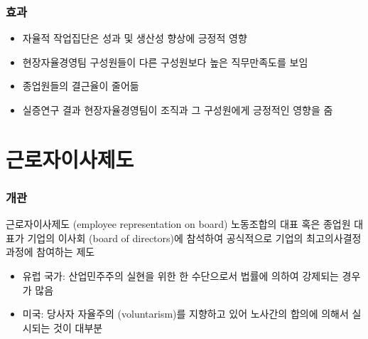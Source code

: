 \documentclass[aspectratio=169,xcolor=dvipsnames,handout]{beamer}
\begin{document}
\begin{frame}
    \frametitle{효과}
    \begin{itemize}[<+->]
        \item 자율적 작업집단은 성과 및 생산성 향상에 긍정적 영향
        \item 현장자율경영팀 구성원들이 다른 구성원보다 높은 직무만족도를 보임
        \item 종업원들의 결근율이 줄어듦
        \item 실증연구 결과 현장자율경영팀이 조직과 그 구성원에게 긍정적인 영향을 줌
    \end{itemize}
\end{frame}

\section{근로자이사제도}

\begin{frame}
    \frametitle{개관}
    \begin{block}{근로자이사제도 (employee representation on board)}
        노동조합의 대표 혹은 종업원 대표가 기업의 이사회 (board of directors)에 참석하여 공식적으로 기업의 최고의사결정과정에 참여하는 제도
    \end{block}
    \begin{itemize}[<+->]
        \item 유럽 국가: 산업민주주의 실현을 위한 한 수단으로서 법률에 의하여 강제되는 경우가 많음
        \item 미국: 당사자 자율주의 (voluntarism)를 지향하고 있어 노사간의 합의에 의해서 실시되는 것이 대부분
    \end{itemize}
\end{frame}
\end{document}
